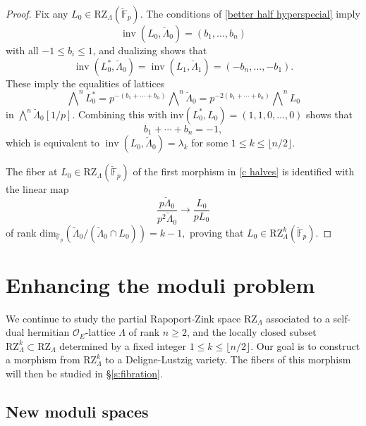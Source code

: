 \documentclass[11pt]{alggeom}
\newcommand{\F}{\mathbb F}
\newcommand{\co}{\mathcal O}
\DeclareMathOperator{\inv}{inv}
\begin{document}
\begin{proof}
 Fix any $L_0 \in \mathrm{RZ}_\Lambda( \breve{\F}_p)$.
 The conditions of \eqref{better half hyperspecial} imply 
\[
\inv(L_0 , \breve{\Lambda}_0)=(b_1, \ldots ,b_n)
\]
with all $-1\le b_i \le 1$, and dualizing shows that 
\[
 \inv( L_0^*  , \breve{\Lambda}_0 ) =   \inv(  L_1  , \breve{\Lambda}_1 ) =  (-b_n, \ldots , - b_1).
\]
These imply the equalities of lattices 
\[
  \bigwedge\nolimits^n L_0^*  = p^{-(b_1+\cdots + b_n)} 
\bigwedge\nolimits^n\breve{\Lambda}_0 = p^{-2(b_1+\cdots + b_n)}   \bigwedge\nolimits^n L_0
\]
in $\bigwedge\nolimits^n\breve{\Lambda}_0[1/p]$.  Combining this with $\mathrm{inv}(  L_0^*,   L_0) = (1,1,0, \ldots,0)$ shows that
\[ b_1+ \cdots + b_n =-1,\] which is equivalent to  $\inv(L_0 , \breve{\Lambda}_0)= \lambda_k$ for some $1\le k \le \lfloor n/2\rfloor$.


The fiber at $L_0 \in \mathrm{RZ}_\Lambda( \breve{\F}_p)$  of the first morphism in  \eqref{c halves} is identified with the linear map
\[
 \frac{ p \breve{\Lambda}_0 }{  p^2 \breve{\Lambda}_0 }    \to \frac{L_0}{pL_0}
\] 
of  rank
 $
 \mathrm{dim}_{\breve{\F}_p} ( \breve{\Lambda}_0 /   ( \breve{\Lambda}_0 \cap L_0  )  ) =k-1,
 $
proving that $L_0 \in \mathrm{RZ}^k_\Lambda( \breve{\F}_p)$.
\end{proof}











\section{Enhancing the moduli problem}
\label{s:enhanced}


We continue to study the partial Rapoport-Zink space $\mathrm{RZ}_\Lambda$ associated to a self-dual hermitian $\co_E$-lattice $\Lambda$ of rank $n\ge 2$, and the  locally closed subset
$
\mathrm{RZ}^k_\Lambda \subset \mathrm{RZ}_\Lambda
$
 determined by  a fixed integer $1\le k\le \lfloor n/2 \rfloor$.
Our goal is to construct a morphism from $\mathrm{RZ}^k_\Lambda$  to a Deligne-Lustzig variety.
The  fibers of this morphism will then be studied in \S \ref{s:fibration}.


\subsection{New moduli spaces}
\label{ss:new moduli}
\end{document}
